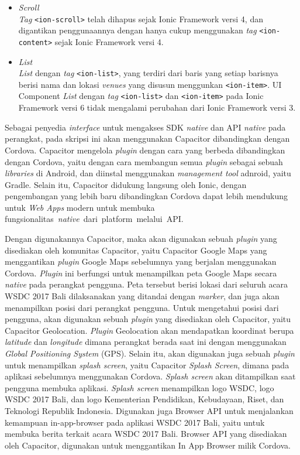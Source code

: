 \begin{enumerate}
\begin{itemize}
			\item \textit{Scroll} \\
			\textit{Tag} \texttt{<ion-scroll>} telah dihapus sejak Ionic Framework versi 4, dan digantikan penggunaannya dengan hanya cukup menggunakan \textit{tag} \texttt{<ion-content>} sejak Ionic Framework versi 4.
		
			\item \textit{List} \\
		\textit{List} dengan \textit{tag} \texttt{<ion-list>}, yang terdiri dari baris yang setiap barisnya berisi nama dan lokasi \textit{venues} yang disusun menggunkan \texttt{<ion-item>}. UI Component \textit{List} dengan \textit{tag} \texttt{<ion-list>} dan \texttt{<ion-item>} pada Ionic Framework versi 6 tidak mengalami perubahan dari Ionic Framework versi 3.
		\end{itemize}


Sebagai penyedia \textit{interface} untuk mengakses SDK \textit{native} dan API \textit{native} pada perangkat, pada skripsi ini akan menggunakan Capacitor dibandingkan dengan Cordova. Capacitor mengelola \textit{plugin} dengan cara yang berbeda dibandingkan dengan Cordova, yaitu dengan cara membangun semua \textit{plugin} sebagai sebuah \textit{libraries} di Android, dan diinstal menggunakan \textit{management tool} adnroid, yaitu Gradle. Selain itu, Capacitor didukung langsung oleh Ionic, dengan pengembangan yang lebih baru dibandingkan Cordova dapat lebih mendukung untuk \textit{Web Apps} modern untuk membuka fungsionalitas~\textit{native}~dari~platform~melalui~API.

Dengan digunakannya Capacitor, maka akan digunakan sebuah \textit{plugin} yang disediakan oleh komunitas Capacitor, yaitu Capacitor Google Maps yang menggantikan \textit{plugin} Google Maps sebelumnya yang berjalan menggunakan Cordova. \textit{Plugin} ini berfungsi untuk menampilkan peta Google Maps secara \textit{native} pada perangkat pengguna. Peta tersebut berisi lokasi dari seluruh acara WSDC 2017 Bali dilaksanakan yang ditandai dengan \textit{marker}, dan juga akan menampilkan posisi dari perangkat pengguna. Untuk mengetahui posisi dari pengguna, akan digunakan sebuah \textit{plugin} yang disediakan oleh Capacitor, yaitu Capacitor Geolocation. \textit{Plugin} Geolocation akan mendapatkan koordinat berupa \textit{latitude} dan \textit{longitude} dimana perangkat berada saat ini dengan menggunakan \textit{Global Positioning System} (GPS). Selain itu, akan digunakan juga sebuah \textit{plugin} untuk menampilkan \textit{splash screen}, yaitu Capacitor \textit{Splash Screen}, dimana pada aplikasi sebelumnya menggunakan Cordova. \textit{Splash screen} akan ditampilkan saat pengguna membuka aplikasi. \textit{Splash screen} menampilkan logo WSDC, logo WSDC 2017 Bali, dan logo Kementerian Pendidikan, Kebudayaan, Riset, dan Teknologi Republik Indonesia. Digunakan juga Browser API untuk menjalankan kemampuan in-app-browser pada aplikasi WSDC 2017 Bali, yaitu untuk membuka berita terkait acara WSDC 2017 Bali. Browser API yang disediakan oleh Capacitor, digunakan untuk menggantikan In App Browser milik Cordova.
\end{enumerate}

